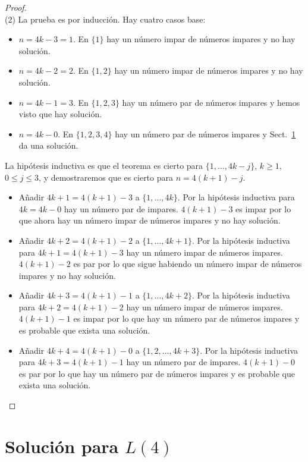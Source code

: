 \begin{proof}
\mbox{}\\
(2)
La prueba es por inducción.
Hay cuatro casos base:
\begin{itemize}
\item $n=4k-3=1$. En $\{1\}$ hay un número impar de números impares y no hay solución.
\item $n=4k-2=2$. En $\{1,2\}$ hay un número impar de números impares y no hay solución.
\item $n=4k-1=3$. En $\{1,2,3\}$ hay un número par de números impares y hemos visto que hay solución.
\item $n=4k-0$. En $\{1,2,3,4\}$ hay un número par de números impares y Sect.~\ref{s.langford-four} da una solución.
\end{itemize}

La hipótesis inductiva es que el teorema es cierto para $\{1,\ldots,4k-j\}$, $k\ge 1$, $0\leq j\leq 3$, y demostraremos que es cierto para $n=4(k+1)-j$.

\begin{itemize}
\item Añadir $4k+1=4(k+1)-3$ a $\{1,\ldots,4k\}$. Por la hipótesis inductiva para $4k=4k-0$ hay un número par de impares. $4(k+1)-3$ es impar por lo que ahora hay un número impar de números impares y no hay solución.
\item Añadir $4k+2=4(k+1)-2$ a $\{1,\ldots,4k+1\}$. Por la hipótesis inductiva para $4k+1=4(k+1)-3$ hay un número impar de números impares. $4(k+1)-2$ es par por lo que sigue habiendo un número impar de números impares y no hay solución.
\item Añadir $4k+3=4(k+1)-1$ a $\{1,\ldots,4k+2\}$. Por la hipótesis inductiva para $4k+2=4(k+1)-2$ hay un número impar de números impares. $4(k+1)-1$ es impar por lo que hay un número par de números impares y es probable que exista una solución.
\item Añadir $4k+4=4(k+1)-0$ a $\{1,2,\ldots,4k+3\}$. Por la hipótesis inductiva para $4k+3=4(k+1)-1$ hay un número par de impares. $4(k+1)-0$ es par por lo que hay un número par de números impares y es probable que exista una solución.
\end{itemize}
\end{proof}




\section{Solución para $L(4)$}\label{s.langford-four}

